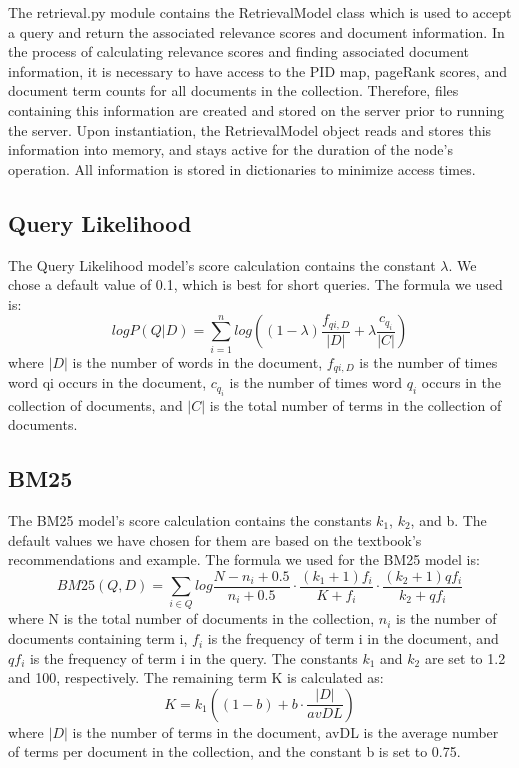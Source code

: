 \documentclass[letterpaper,11pt,twoside]{article}
\begin{document}
The retrieval.py module contains the RetrievalModel class which is used to accept a query and return the associated relevance scores and document information. In the process of calculating relevance scores and finding associated document information, it is necessary to have access to the PID map, pageRank scores, and document term counts for all documents in the collection. Therefore, files containing this information are created and stored on the server prior to running the server. Upon instantiation, the RetrievalModel object reads and stores this information into memory, and stays active for the duration of the node's operation. All information is stored in dictionaries to minimize access times.

\subsection{Query Likelihood}
The Query Likelihood model's score calculation contains the constant \(\lambda\). We chose a default value of 0.1, which is best for short queries. The formula we used is:
\[
log P(Q|D)=\sum_{i=1}^{n}log((1-\lambda)\frac{f_{qi,D}}{|D|}+\lambda\frac{c_{q_{i}}}{|C|})
\]
where \(|D|\) is the number of words in the document, \(f_{qi,D}\) is the number of times word qi occurs in the document, \(c_{q_{i}}\) is the number of times word \(q_{i}\) occurs in the collection of documents, and \(|C|\) is the total number of terms in the collection of documents.

\subsection{BM25}
The BM25 model's score calculation contains the constants \(k_{1}\), \(k_{2}\), and b. The default values we have chosen for them are based on the textbook's recommendations and example. The formula we used for the BM25 model is:
\[
BM25(Q,D)=\sum_{i \in Q}log\frac{N-n_{i}+0.5}{n_{i}+0.5}\cdot \frac{(k_{1}+1)f_{i}}{K+f_{i}}\cdot \frac{(k_{2}+1)qf_{i}}{k_{2}+qf_{i}}
\]
where N is the total number of documents in the collection, \(n_{i}\) is the number of documents containing term i, \(f_{i}\) is the frequency of term i in the document, and \(qf_{i}\) is the frequency of term i in the query. The constants \(k_{1}\) and \(k_{2}\) are set to 1.2 and 100, respectively. The remaining term K is calculated as:
\[
K=k_{1}((1-b)+b\cdot \frac{|D|}{avDL})
\]
where \(|D|\) is the number of terms in the document, avDL is the average number of terms per document in the collection, and the constant b is set to 0.75.
\end{document}
